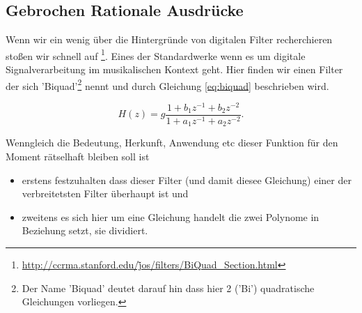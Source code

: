 \subsection{Gebrochen Rationale Ausdrücke}\label{subsec:rationalExp}
Wenn wir ein wenig über die Hintergründe von digitalen Filter recherchieren stoßen wir schnell auf 
\cite{FILTERSWEB07}\footnote{\href{http://ccrma.stanford.edu/\~jos/filters/BiQuad\_Section.html}{http://ccrma.stanford.edu/\~jos/filters/BiQuad\_Section.html}}. Eines der Standardwerke wenn es um digitale Signalverarbeitung im musikalischen Kontext geht. Hier finden wir einen Filter der sich 'Biquad'\footnote{Der Name 'Biquad' deutet darauf hin dass hier 2 ('Bi') quadratische Gleichungen vorliegen.} nennt und durch Gleichung \ref{eq:biquad} beschrieben wird.

% 

\begin{equation}
H(z) = g\frac{1 + b_1 z^{-1}+ b_2 z^{-2}}{1 + a_1 z^{-1}+ a_2 z^{-2}}. \label{eq:biquad}
\end{equation}

Wenngleich die Bedeutung, Herkunft, Anwendung etc dieser Funktion für den Moment rätselhaft bleiben soll ist 
\begin{itemize}
\item erstens festzuhalten dass dieser Filter (und damit diesee Gleichung) einer der verbreitetsten Filter überhaupt ist und 
\item zweitens es sich hier um eine Gleichung handelt die zwei Polynome in Beziehung setzt, sie dividiert. \\
\end{itemize}





